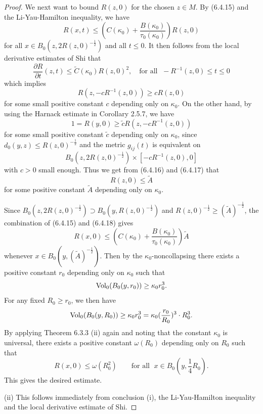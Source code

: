 \begin{proof}
We next want to bound $R(z,0)$ for the chosen $z\in M$. By
(6.4.15) and the Li-Yau-Hamilton inequality, we have
$$
R(x,t)\le (C(\kappa_0)+\frac{B(\kappa_0)}{\tau_0(\kappa_0)})R(z,0)
$$
for all $x\in B_0(z,2R(z,0)^{-\frac{1}{2}})$ and all $t\le 0$. It
then follows from the local derivative estimates of Shi that
$$
\frac{\partial R}{\partial t}(z,t)
\le\widetilde{C}(\kappa_0)R(z,0)^2,\quad \mbox{for all }\;
-R^{-1}(z,0)\leq t\leq 0
$$
which implies \begin{equation}
R(z,-cR^{-1}(z,0))\ge cR(z,0)  %
\end{equation} for some small positive constant $c$ depending only on
$\kappa_0$. On the other hand, by using the Harnack estimate in
Corollary 2.5.7, we have \begin{equation}
1=R(y,0)\ge\widetilde{c}R(z,-cR^{-1}(z,0)) %
\end{equation} for some small positive constant $\widetilde{c}$ depending
only on $\kappa_0$, since $d_0(y,z)\le R(z,0)^{-\frac{1}{2}}$ and
the metric $g_{ij}(t)$ is equivalent on
$$
B_0(z,2R(z,0)^{-\frac{1}{2}})\times[-cR^{-1}(z,0),0]
$$
with $c>0$ small enough. Thus we get from (6.4.16) and (6.4.17)
that \begin{equation}
R(z,0)\le\widetilde{A} %
\end{equation} for some positive constant $\widetilde{A}$ depending only on
$\kappa_0$.

Since $B_0(z,2R(z,0)^{-\frac{1}{2}})\supset
B_0(y,R(z,0)^{-\frac{1}{2}})$ and $R(z,0)^{-\frac{1}{2}}\ge
(\widetilde{A})^{-\frac{1}{2}}$, the combination of (6.4.15) and
(6.4.18) gives \begin{equation} R(x,0)\le
(C(\kappa_0)+\frac{B(\kappa_0)}{\tau_0(\kappa_0)})
\widetilde{A}  %
\end{equation} whenever $x\in B_0(y,(\widetilde{A})^{-\frac{1}{2}})$. Then by
the $\kappa_0$-noncollapsing there exists a positive constant
$r_0$ depending only on $\kappa_0$ such that
$$
\operatorname{Vol}_0(B_0(y,r_0))\ge \kappa_0r_0^3.
$$
For any fixed $R_0\ge r_0$, we then have
$$
\operatorname{Vol}_0(B_0(y,R_0))\ge \kappa_0r_0^3
=\kappa_0(\frac{r_0}{R_0})^3\cdot R_0^3.
$$
By applying Theorem 6.3.3 (ii) again and noting that the constant
$\kappa_0$ is universal, there exists a positive constant
$\omega(R_0)$ depending only on $R_0$ such that
$$
R(x,0)\le\omega(R_0^2)\qquad \mbox{for all }\; x\in
B_0(y,\frac{1}{4}R_0).
$$
This gives the desired estimate.

\medskip
(ii) This follows immediately from  conclusion (i), the
Li-Yau-Hamilton inequality and the local derivative estimate of
Shi.
\end{proof}


